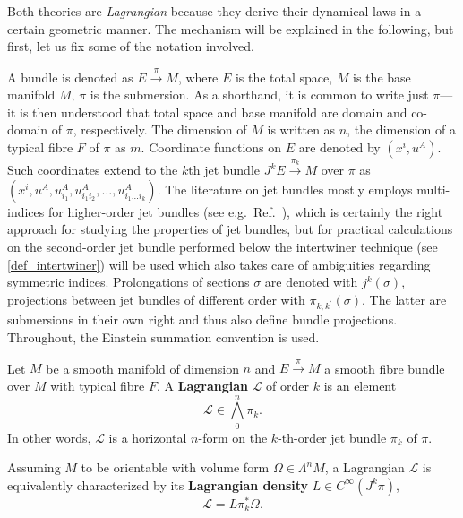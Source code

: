 Both theories are \emph{Lagrangian} because they derive their dynamical laws in a certain geometric manner. The mechanism will be explained in the following, but first, let us fix some of the notation involved.

A bundle is denoted as $E\overset{\pi}{\longrightarrow}M$, where $E$ is the total space, $M$ is the base manifold $M$, $\pi$ is the submersion. As a shorthand, it is common to write just $\pi$---it is then understood that total space and base manifold are domain and co-domain of $\pi$, respectively. The dimension of $M$ is written as $n$, the dimension of a typical fibre $F$ of $\pi$ as $m$. Coordinate functions on $E$ are denoted by $(x^i,u^A)$. Such coordinates extend to the $k$th jet bundle $J^kE \overset{\pi_k}{\longrightarrow}M$ over $\pi$ as $(x^i,\allowbreak u^A,\allowbreak u^A_{i_1},\allowbreak u^A_{i_1i_2},\allowbreak \dots,\allowbreak u^A_{i_1\dots i_k})$. The literature on jet bundles mostly employs multi-indices for higher-order jet bundles (see e.g.~Ref.~\cite{saunders}), which is certainly the right approach for studying the properties of jet bundles, but for practical calculations on the second-order jet bundle performed below the intertwiner technique (see \ref{def_intertwiner}) will be used which also takes care of ambiguities regarding symmetric indices. Prolongations of sections $\sigma$ are denoted with $j^k(\sigma)$, projections between jet bundles of different order with $\pi_{k,k^\prime}(\sigma)$. The latter are submersions in their own right and thus also define bundle projections. Throughout, the Einstein summation convention is used.

\begin{definition}[Lagrangian]
  Let $M$ be a smooth manifold of dimension $n$ and $E \overset{\pi}{\longrightarrow} M$ a smooth fibre bundle over $M$ with typical fibre $F$. A \textbf{Lagrangian} $\mathscr L$ of order $k$ is an element
  \begin{equation}
    \mathscr L \in \textstyle\bigwedge^n_0\pi_k.
  \end{equation}
In other words, $\mathscr L$ is a horizontal $n$-form on the $k$-th-order jet bundle $\pi_k$ of $\pi$.

Assuming $M$ to be orientable with volume form $\Omega\in\Lambda^nM$, a Lagrangian $\mathscr L$ is equivalently characterized by its \textbf{Lagrangian density} $L\in C^\infty(J^k\pi)$,
  \begin{equation}\label{lagrangian_density}
  \mathscr L = L\pi_k^\ast\Omega.
\end{equation}
\end{definition}

